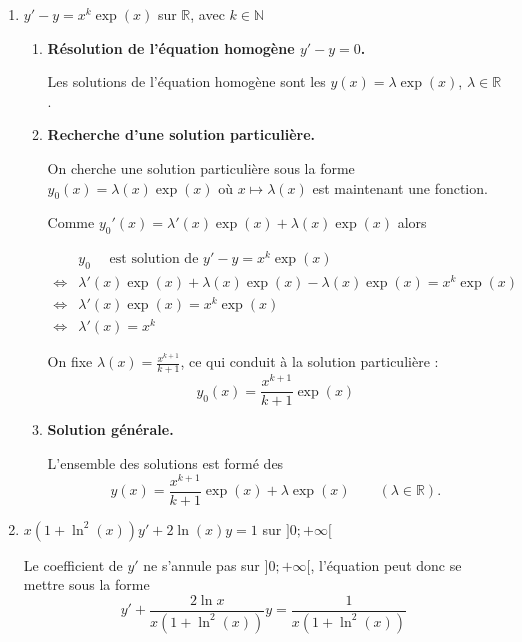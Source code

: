 \documentclass[11pt,a4paper]{article}
\newcommand{\Nn}{\mathbb{N}} \newcommand{\N}{\mathbb{N}}
\newcommand{\Rr}{\mathbb{R}} \newcommand{\R}{\mathbb{R}}
\begin{document}
\begin{enumerate}
\begin{enumerate}
    L'ensemble des solutions s'obtient par la somme de la solution particulière avec les solutions de l'équation
    homogène. Autrement dit, les solutions sont les :
    $$y(x) = -\frac1{2x} + \lambda \frac1x\exp(x^2)\qquad (\lambda\in\Rr).$$
    
  \end{enumerate}  

  \item $y'-y = x^k \exp(x)$ sur $\R$, avec $k \in \Nn$
  \begin{enumerate}
    \item  \textbf{Résolution de l'équation homogène $y' - y = 0$.}
    
    Les solutions de l'équation homogène sont les $y(x) = \lambda \exp(x)$, $\lambda \in \Rr$.
        
    \item \textbf{Recherche d'une solution particulière.}
    
    On cherche une solution particulière sous la forme $y_0(x) = \lambda(x) \exp(x)$ 
    où $x \mapsto \lambda(x)$ est maintenant une fonction.
    
    Comme $y_0'(x) = \lambda'(x)\exp(x) + \lambda(x) \exp(x)$
    alors

    \begin{align*}
          & y_0 \quad \text{ est  solution de }  y' - y = x^k \exp(x) \\
    \iff& \lambda'(x)\exp(x) + \lambda(x) \exp(x) - \lambda(x) \exp(x) = x^k \exp(x)\\
    \iff& \lambda'(x)\exp(x) = x^k \exp(x)\\
    \iff& \lambda'(x) = x^k
    \end{align*}
    
    On fixe $\lambda(x) = \frac{x^{k+1}}{k+1}$, ce qui conduit à la solution particulière :
    $$y_0(x) = \frac{x^{k+1}}{k+1} \exp(x)$$
    
    \item \textbf{Solution générale.}    
    
    L'ensemble des solutions est formé des 
    $$y(x) =\frac{x^{k+1}}{k+1} \exp(x) + \lambda \exp(x)\qquad (\lambda\in\Rr).$$
    
  \end{enumerate}  
  
  
\item $x(1+\ln^2(x))y'+2\ln(x)y=1$ sur $]0;+\infty[$

Le coefficient de $y'$ ne s'annule pas sur $]0;+\infty[$, l'équation peut donc se mettre sous la forme
$$y'+\frac{2\ln x}{x(1+\ln^2(x))}y=\frac{1}{x(1+\ln^2(x))}$$
  \begin{enumerate}
  

\end{enumerate}
\end{enumerate}
\end{document}
